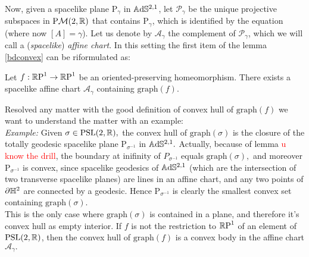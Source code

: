 Now, given a spacelike plane $\text{P}_\gamma$ in $\A^{2,1}$, let $\mathcal{P}_\gamma$ be the unique projective subspaces in $\text{P}\mathcal{M}(2,\R)$ that contains $\text{P}_\gamma$, which is identified by the equation  (where now $[A]=\gamma$). Let us denote by $\mathcal{A}_\gamma$ the complement of $\mathcal{P}_\gamma$, which we will call a (\textit{spacelike}) \textit{affine chart}. In this setting the first item of the lemma \ref{bdconvex} can be riformulated as: 
\begin{corollary}\label{affinechart}
    Let $f:\S\to\S$ be an oriented-preserving homeomorphism. There exists a spacelike affine chart $\mathcal{A}_\gamma$ containing $\text{graph}(f)$.
\end{corollary} 

Resolved any matter with the good definition of convex hull of $\text{graph}(f)$ we want to understand the matter with an example: \\
\textit{Example:} Given $\sigma \in \PSL,$ the convex hull of $\text{graph}(\sigma)$ is the closure of the totally geodesic spacelike plane $\text{P}_{\sigma^{-1}}$ in $\A^{2,1}.$ Actually, because of lemma \textcolor{red}{u know the drill}, the boundary at inifinity of $P_{\sigma^{-1}}$ equals $\text{graph}(\sigma),$ and moreover $\text{P}_{\sigma^{-1}}$ is convex, since spacelike geodesics of $\A^{2,1}$ (which are the intersection of two transverse spacelike planes) are lines in an affine chart, and any two points of $\partial\H^2$ are connected by a geodesic. Hence $\text{P}_{\sigma^{-1}}$ is clearly the smallest convex set containing $\text{graph}(\sigma).$\\
This is the only case where $\text{graph}(\sigma)$ is contained in a plane, and therefore it's convex hull as empty interior. If $f$ is not the restriction to $\S$ of an element of $\PSL$, then the convex hull of $\text{graph}(f)$ is a convex body in the affine chart $\mathcal{A}_\gamma.$

